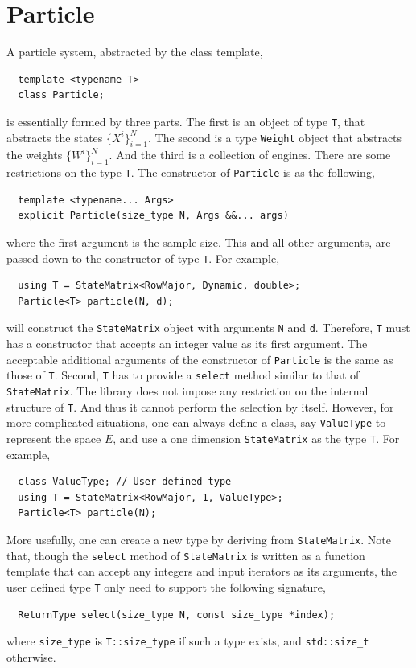 \section{Particle}
\label{sec:Particle}

A particle system, abstracted by the class template,
\begin{Verbatim}
  template <typename T>
  class Particle;
\end{Verbatim}
is essentially formed by three parts. The first is an object of type \verb|T|,
that abstracts the states $\{X^i\}_{i=1}^N$. The second is a type \verb|Weight|
object that abstracts the weights $\{W^i\}_{i=1}^N$. And the third is a
collection of \cppoo{} \rng engines. There are some restrictions on the type
\verb|T|. The constructor of \verb|Particle| is as the following,
\begin{Verbatim}
  template <typename... Args>
  explicit Particle(size_type N, Args &&... args)
\end{Verbatim}
where the first argument is the sample size. This and all other arguments, are
passed down to the constructor of type \verb|T|. For example,
\begin{Verbatim}
  using T = StateMatrix<RowMajor, Dynamic, double>;
  Particle<T> particle(N, d);
\end{Verbatim}
will construct the \verb|StateMatrix| object with arguments \verb|N| and
\verb|d|. Therefore, \verb|T| must has a constructor that accepts an integer
value as its first argument. The acceptable additional arguments of the
constructor of \verb|Particle| is the same as those of \verb|T|. Second,
\verb|T| has to provide a \verb|select| method similar to that of
\verb|StateMatrix|. The library does not impose any restriction on the internal
structure of \verb|T|. And thus it cannot perform the selection by itself.
However, for more complicated situations, one can always define a class, say
\verb|ValueType| to represent the space $E$, and use a one dimension
\verb|StateMatrix| as the type \verb|T|. For example,
\begin{Verbatim}
  class ValueType; // User defined type
  using T = StateMatrix<RowMajor, 1, ValueType>;
  Particle<T> particle(N);
\end{Verbatim}
More usefully, one can create a new type by deriving from \verb|StateMatrix|.
Note that, though the \verb|select| method of \verb|StateMatrix| is written as
a function template that can accept any integers and input iterators as its
arguments, the user defined type \verb|T| only need to support the following
signature,
\begin{Verbatim}
  ReturnType select(size_type N, const size_type *index);
\end{Verbatim}
where \verb|size_type| is \verb|T::size_type| if such a type exists, and
\verb|std::size_t| otherwise.

